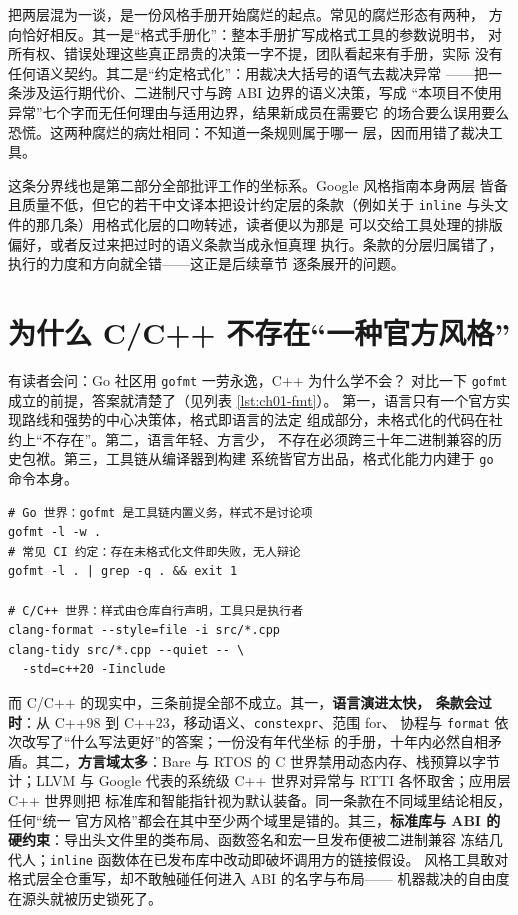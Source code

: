 \documentclass[12pt,a4paper,fontset=fandol]{ctexbook}
\newcommand{\cpp}[1]{C++#1}
\newcommand{\Tp}[1]{\texttt{#1}}
\newcommand{\Bk}{\discretionary{}{}{}}
\newcommand{\Lang}[1]{\textsf{#1}}
\newcommand{\CL}{\Lang{C}}
\newcommand{\CPP}{\Lang{C++}}
\newcommand{\DomGo}{\Lang{Google}}
\newcommand{\DomLlvm}{\Lang{LLVM}}
\newcommand{\DomBare}{\Lang{Bare}}
\newcommand{\DomRtos}{\Lang{RTOS}}
\begin{document}
把两层混为一谈，是一份风格手册开始腐烂的起点。常见的腐烂形态有两种，
方向恰好相反。其一是``格式手册化''：整本手册扩写成格式工具的参数说明书，
对所有权、错误处理这些真正昂贵的决策一字不提，团队看起来有手册，实际
没有任何语义契约。其二是``约定格式化''：用裁决大括号的语气去裁决异常
——把一条涉及运行期代价、二进制尺寸与跨 ABI 边界的语义决策，写成
``本项目不使用异常''七个字而无任何理由与适用边界，结果新成员在需要它
的场合要么误用要么恐慌。这两种腐烂的病灶相同：不知道一条规则属于哪一
层，因而用错了裁决工具。

这条分界线也是第二部分全部批评工作的坐标系。\DomGo{} 风格指南本身两层
皆备且质量不低，但它的若干中文译本把设计约定层的条款（例如关于
\Tp{inline} 与头文件的那几条）用格式化层的口吻转述，读者便以为那是
可以交给工具处理的排版偏好，或者反过来把过时的语义条款当成永恒真理
执行。条款的分层归属错了，执行的力度和方向就全错——这正是后续章节
逐条展开的问题。

\section{为什么 \CL/\CPP{} 不存在``一种官方风格''}
\label{sec:ch01-nostyle}

有读者会问：\Lang{Go} 社区用 \Tp{gofmt} 一劳永逸，\CPP{} 为什么学不会？
对比一下 \Tp{gofmt} 成立的前提，答案就清楚了（见列表 \ref{lst:ch01-fmt}）。
第一，语言只有一个官方实现路线和强势的中心决策体，格式即语言的法定
组成部分，未格式化的代码在社约上``不存在''。第二，语言年轻、方言少，
不存在必须跨三十年二进制兼容的历史包袱。第三，工具链从编译器到构建
系统皆官方出品，格式化能力内建于 \texttt{go} 命令本身。

\begin{lstlisting}[style=shellstyle,caption={两种世界的格式化仪式：左边是义务，右边是协商},label={lst:ch01-fmt}]
# Go 世界：gofmt 是工具链内置义务，样式不是讨论项
gofmt -l -w .
# 常见 CI 约定：存在未格式化文件即失败，无人辩论
gofmt -l . | grep -q . && exit 1

# C/C++ 世界：样式由仓库自行声明，工具只是执行者
clang-format --style=file -i src/*.cpp
clang-tidy src/*.cpp --quiet -- \
  -std=c++20 -Iinclude
\end{lstlisting}

而 \CL/{\Bk}\CPP{} 的现实中，三条前提全部不成立。其一，\textbf{语言演进太快，
条款会过时}：从 \cpp{98} 到 \cpp{23}，移动语义、\Tp{constexpr}、范围 for、
协程与 \Tp{format} 依次改写了``什么写法更好''的答案；一份没有年代坐标
的手册，十年内必然自相矛盾。其二，\textbf{方言域太多}：\DomBare{} 与
\DomRtos{} 的 \CL{} 世界禁用动态内存、栈预算以字节计；\DomLlvm{} 与 \DomGo{}
代表的系统级 \CPP{} 世界对异常与 RTTI 各怀取舍；应用层 \CPP{} 世界则把
标准库和智能指针视为默认装备。同一条款在不同域里结论相反，任何``统一
官方风格''都会在其中至少两个域里是错的。其三，\textbf{标准库与 ABI 的
硬约束}：导出头文件里的类布局、函数签名和宏一旦发布便被二进制兼容
冻结几代人；\Tp{inline} 函数体在已发布库中改动即破坏调用方的链接假设。
风格工具敢对格式层全仓重写，却不敢触碰任何进入 ABI 的名字与布局——
机器裁决的自由度在源头就被历史锁死了。
\end{document}
